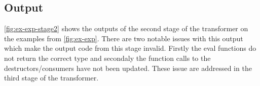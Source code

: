 \documentclass[ oneside,%
                    author={James Elgar},
                    degree={MEng},
                     title={Bidirectional transformer between functional and \\ object-oriented programming in Rust},
                  subtitle={}]{dissertation}
\begin{document}
\subsection{Output}

\autoref{fig:ex-exp-stage2} shows the outputs of the second stage of the transformer on the examples from \autoref{fig:ex-exp}. There are two notable issues with this output which make the output code from this stage invalid. Firstly the eval functions do not return the correct type and secondaly the function calls to the destructors/consumers have not been updated. These issue are addressed in the third stage of the transformer.






\end{document}
